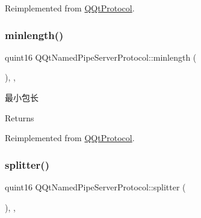 Reimplemented from \mbox{\hyperlink{class_q_qt_protocol_af41bc3116abbbcfc9af45e151a253ff7}{Q\+Qt\+Protocol}}.

\mbox{\label{class_q_qt_named_pipe_server_protocol_ad45fdcc8ed9b558d267995d9d44b1f01}} 
\subsubsection{\texorpdfstring{minlength()}{minlength()}}
{\footnotesize\ttfamily quint16 Q\+Qt\+Named\+Pipe\+Server\+Protocol\+::minlength (\begin{DoxyParamCaption}{ }\end{DoxyParamCaption})\hspace{0.3cm}{\ttfamily [override]}, {\ttfamily [protected]}, {\ttfamily [virtual]}}



最小包长 

\begin{DoxyReturn}{Returns}

\end{DoxyReturn}


Reimplemented from \mbox{\hyperlink{class_q_qt_protocol_a2b00f53d3dd0eed817eeecff422891f3}{Q\+Qt\+Protocol}}.

\mbox{\label{class_q_qt_named_pipe_server_protocol_ae5cf336bee9a7062e099a8eb7ef7d069}} 
\subsubsection{\texorpdfstring{splitter()}{splitter()}}
{\footnotesize\ttfamily quint16 Q\+Qt\+Named\+Pipe\+Server\+Protocol\+::splitter (\begin{DoxyParamCaption}\item[{const Q\+Byte\+Array \&}]{ }\end{DoxyParamCaption})\hspace{0.3cm}{\ttfamily [override]}, {\ttfamily [protected]}, {\ttfamily [virtual]}}



